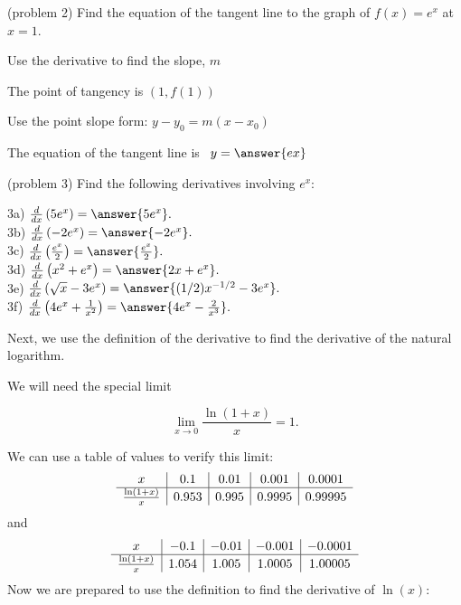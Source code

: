 \documentclass{ximera}
\begin{document}
\begin{problem}(problem 2)
Find the equation of the tangent line to the graph of $f(x) = e^x$ at $x = 1$.
\begin{hint}
Use the derivative to find the slope, $m$
\end{hint}
\begin{hint}
The point of tangency is $(1, f(1))$
\end{hint}
\begin{hint}
Use the point slope form: $y-y_0 = m(x-x_0)$
\end{hint}

The equation of the tangent line is \ $y = \answer{ex}$
\end{problem}


\begin{problem}(problem 3)
Find the following derivatives involving $e^x$:

3a) $\frac{d}{dx} \left(5e^x\right) = \answer{5e^x}.$\\
3b) $\frac{d}{dx} \left(-2e^x\right) = \answer{-2e^x}.$\\
3c) $\frac{d}{dx} \left(\frac{e^x}{2}\right) = \answer{\frac{e^x}{2}}.$\\
3d) $\frac{d}{dx} \left(x^2 + e^x\right) = \answer{2x + e^x}.$\\
3e) $\frac{d}{dx} \left(\sqrt x - 3e^x\right) = \answer{(1/2)x^{-1/2} - 3e^x}.$\\
3f) $\frac{d}{dx} \left(4e^x + \frac{1}{x^2}\right) = \answer{4e^x -\frac{2}{x^3}}.$


\end{problem}


Next, we use the definition of the derivative to find the derivative of the natural logarithm.



We will need the special limit 

\[
\lim_{x \to 0} \frac{\ln(1 + x)}{x} = 1.
\]

We can use a table of values to verify this limit:
\[
\begin{array}{ c | c | c | c | c }
  x & 0.1 & 0.01  & 0.001 & 0.0001 \\ 
	\hline
	 \frac{\ln(1+x)}{x} & 0.953 & 0.995 & 0.9995 & 0.99995
\end{array}
\]
and
\[
\begin{array}{ c | c | c | c | c }
  x & -0.1 & -0.01  & -0.001 & -0.0001 \\ 
	\hline
	 \frac{\ln(1+x)}{x} & 1.054 & 1.005 & 1.0005 & 1.00005
\end{array}
\]
Now we are prepared to use the definition to find the derivative of $\ln(x)$:
\end{document}
